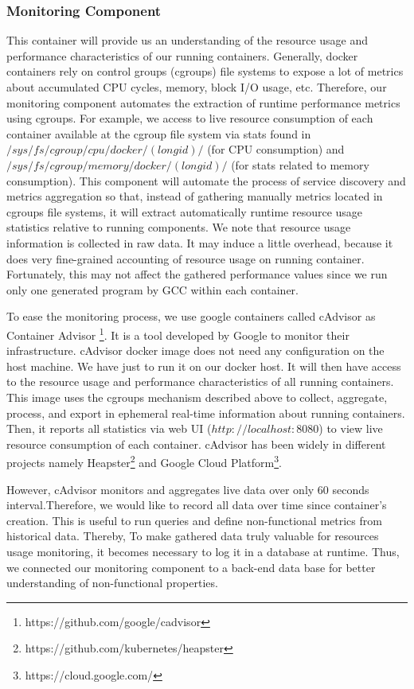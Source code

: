\subsubsection{Monitoring Component}
This container will provide us an understanding of the resource usage and performance characteristics of our running containers. Generally, docker containers rely on control groups (cgroups) file systems to expose a lot of metrics about accumulated CPU cycles, memory, block I/O usage, etc. Therefore, our monitoring component automates the extraction of runtime performance metrics using cgroups. For example, we access to live resource consumption of each container available at the cgroup file system via stats found in $/sys/fs/cgroup/cpu/docker/(longid)/$ (for CPU consumption) and $/sys/fs/cgroup/memory/docker/(longid)/$ (for stats related to memory consumption). This component will automate the process of service discovery and metrics aggregation so that, instead of gathering manually metrics located in cgroups file systems, it will extract automatically runtime resource usage statistics relative to running components. We note that resource usage information is collected in raw data. It may induce a little overhead, because it does very fine-grained accounting of resource usage on running container. Fortunately, this may not affect the gathered performance values since we run only one generated program by GCC within each container.

To ease the monitoring process, we use google containers called cAdvisor as Container Advisor \footnote{https://github.com/google/cadvisor}. It is a tool developed by Google to monitor their infrastructure. 
cAdvisor docker image does not need any configuration on the host machine. We have just to run it on our docker host. It will then have access to the resource usage and performance characteristics of all running containers. This image uses the cgroups mechanism described above to collect, aggregate, process, and export in ephemeral real-time information about running containers. Then, it reports all statistics via web UI ($http://localhost:8080$) to view live resource consumption of each container. cAdvisor has been widely in different projects namely Heapster\footnote{https://github.com/kubernetes/heapster} and Google Cloud Platform\footnote{https://cloud.google.com/}.

However, cAdvisor monitors and aggregates live data over only 60 seconds interval.Therefore, we would like to record all data over time since container's creation. This is useful to run queries and define non-functional metrics from historical data. Thereby, To make gathered data truly valuable for resources usage monitoring, it becomes necessary to log it in a database at runtime. Thus, we connected our monitoring component to a back-end data base for better understanding of non-functional properties. 
